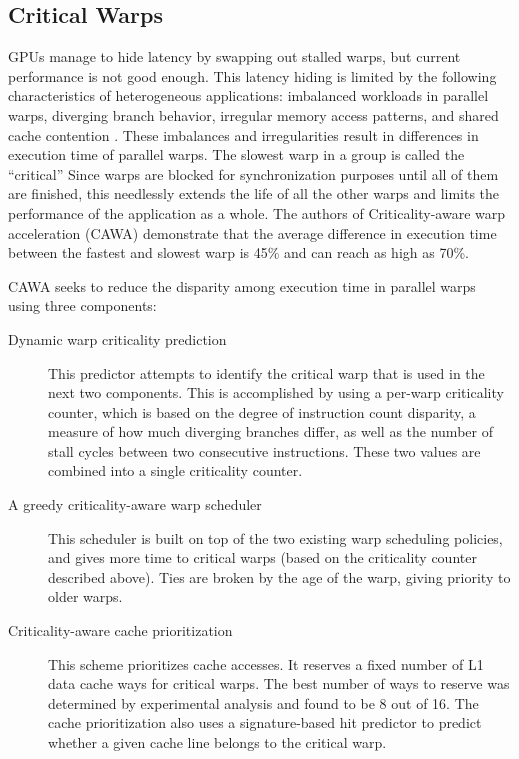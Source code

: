 \documentclass[prodmode,acmtecs]{acmsmall} %
\begin{document}
\subsection{Critical Warps}
GPUs manage to hide latency by swapping out stalled warps, but current
performance is not good enough. This latency hiding is limited by the following
characteristics of heterogeneous applications: imbalanced workloads in parallel
warps, diverging branch behavior, irregular memory access patterns, and shared
cache contention \cite{CoordinatedWarpScheduling}. These imbalances and
irregularities result in differences in execution time of parallel warps. The
slowest warp in a group is called the ``critical'' Since warps are blocked for
synchronization purposes until all of them are finished, this needlessly extends
the life of all the other warps and limits the performance of the application as
a whole. The authors of Criticality-aware warp acceleration (CAWA) demonstrate
that the average difference in execution time between the fastest and slowest
warp is 45\% and can reach as high as 70\%.

CAWA seeks to reduce the disparity among execution time in parallel warps using
three components:
\begin{description}
  \item[Dynamic warp criticality prediction] This predictor attempts to identify
  the critical warp that is used in the next two components. This is
  accomplished by using a per-warp criticality counter, which is based on the
  degree of instruction count disparity, a measure of how much diverging
  branches differ, as well as the number of stall cycles between two consecutive
  instructions. These two values are combined into a single criticality counter.
  \item[A greedy criticality-aware warp scheduler] This scheduler is built on
  top of the two existing warp scheduling policies, and gives more time to
  critical warps (based on the criticality counter described above). Ties are
  broken by the age of the warp, giving priority to older warps.
  \item[Criticality-aware cache prioritization] This scheme prioritizes cache
  accesses. It reserves a fixed number of L1 data cache ways for critical warps.
  The best number of ways to reserve was determined by experimental analysis and
  found to be 8 out of 16. The cache prioritization also uses a signature-based
  hit predictor to predict whether a given cache line belongs to the critical
  warp.
\end{description}
\end{document}
